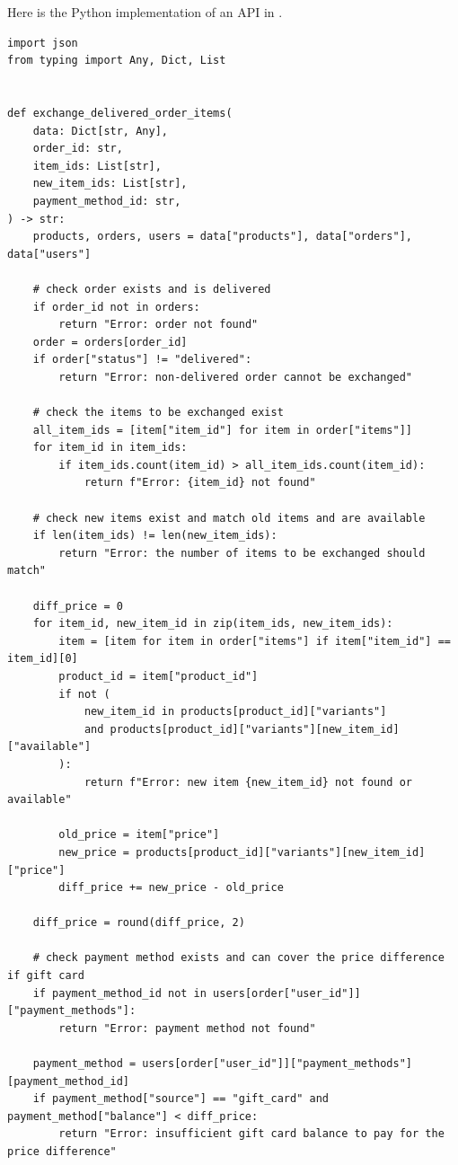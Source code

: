 Here is the Python implementation of an API in \retail{}.

\begin{verbatim}
import json
from typing import Any, Dict, List


def exchange_delivered_order_items(
    data: Dict[str, Any],
    order_id: str,
    item_ids: List[str],
    new_item_ids: List[str],
    payment_method_id: str,
) -> str:
    products, orders, users = data["products"], data["orders"], data["users"]

    # check order exists and is delivered
    if order_id not in orders:
        return "Error: order not found"
    order = orders[order_id]
    if order["status"] != "delivered":
        return "Error: non-delivered order cannot be exchanged"

    # check the items to be exchanged exist
    all_item_ids = [item["item_id"] for item in order["items"]]
    for item_id in item_ids:
        if item_ids.count(item_id) > all_item_ids.count(item_id):
            return f"Error: {item_id} not found"

    # check new items exist and match old items and are available
    if len(item_ids) != len(new_item_ids):
        return "Error: the number of items to be exchanged should match"

    diff_price = 0
    for item_id, new_item_id in zip(item_ids, new_item_ids):
        item = [item for item in order["items"] if item["item_id"] == item_id][0]
        product_id = item["product_id"]
        if not (
            new_item_id in products[product_id]["variants"]
            and products[product_id]["variants"][new_item_id]["available"]
        ):
            return f"Error: new item {new_item_id} not found or available"

        old_price = item["price"]
        new_price = products[product_id]["variants"][new_item_id]["price"]
        diff_price += new_price - old_price

    diff_price = round(diff_price, 2)

    # check payment method exists and can cover the price difference if gift card
    if payment_method_id not in users[order["user_id"]]["payment_methods"]:
        return "Error: payment method not found"

    payment_method = users[order["user_id"]]["payment_methods"][payment_method_id]
    if payment_method["source"] == "gift_card" and payment_method["balance"] < diff_price:
        return "Error: insufficient gift card balance to pay for the price difference"


\end{verbatim}
